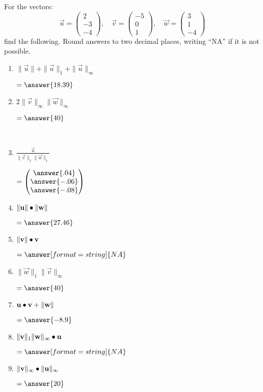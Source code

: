 \documentclass{ximera}
\author{Parisa Fatheddin}
\begin{document}
\begin{exercise}
For the vectors:
\[\vec{u}= \begin{pmatrix}
2\\
-3\\
-4
\end{pmatrix}, \quad \vec{v} = \begin{pmatrix} -5\\ 0\\ 1 \end{pmatrix}, \quad 
\vec{w} = \begin{pmatrix} 3 \\ 1 \\ -4 \end{pmatrix}\] find the
following. Round answers to two decimal places, writing ``NA'' if it is not possible.
\begin{enumerate}
\item $\|\vec{u}\| + \|\vec{u}\|_{1} + \|\vec{u}\|_{\infty}$
\begin{prompt}
$=\answer{18.39}$
\end{prompt}
\item $2 \|\vec{v}\|_{\infty} \|\vec{w}\|_{\infty}$
\begin{prompt}
$=\answer{40}$
\end{prompt}\\
\item $\frac{\vec{u}}{\|\vec{v}\|_{1} \|\vec{w}\|_{1}}$
\begin{prompt}
$=\begin{pmatrix} \answer{.04} \\
\answer{-.06} \\
\answer{-.08}
\end{pmatrix}$
\end{prompt}
\item $\|\mathbf{u}\| \bullet \|\mathbf{w}\|$
\begin{prompt}
$=\answer{27.46}$
\end{prompt} 
\item $\|\mathbf{v}\| \bullet \mathbf{v}$
\begin{prompt}
$=\answer[format=string]{NA}$
\end{prompt}
\item $\|\vec{w}\|_{1} \|\vec{v}\|_{\infty}$
\begin{prompt}
$=\answer{40}$
\end{prompt}
\item $\mathbf{u} \bullet \mathbf{v} + \|\mathbf{w}\|$
\begin{prompt}
$=\answer{-8.9}$
\end{prompt} 
\item $\|\mathbf{v}\|_{1} \|\mathbf{w}\|_{\infty} \bullet \mathbf{u}$
\begin{prompt}
$=\answer[format=string]{NA}$
\end{prompt}
\item $\|\mathbf{v}\|_{\infty} \bullet \|\mathbf{u}\|_{\infty}$
\begin{prompt}
$=\answer{20}$
\end{prompt}
    \pdfOnly{\end{multicols}}
\end{enumerate}
\end{exercise}
\end{document}
